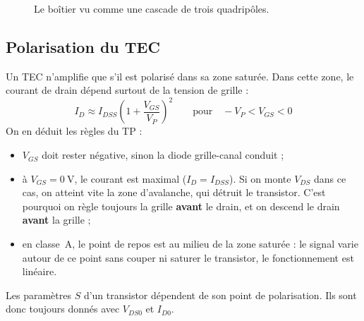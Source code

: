 \documentclass[12pt,a4paper]{article}
\begin{document}
\begin{figure}[H]
\centering
{}
\caption{Le boîtier vu comme une cascade de trois quadripôles.}
\label{fig:cascade}
\end{figure}

\subsection{Polarisation du TEC}

Un TEC n’amplifie que s’il est polarisé dans sa zone saturée. Dans cette zone, le courant de
drain dépend surtout de la tension de grille :
\begin{equation}
  I_D \approx I_{DSS}\left(1 + \frac{V_{GS}}{V_P}\right)^{2}
  \qquad\text{pour}\quad -V_P < V_{GS} < 0
  \label{eq:id}
\end{equation}
On en déduit les règles du TP :
\begin{itemize}
  \item $V_{GS}$ doit rester négative, sinon la diode grille-canal conduit ;
  \item à $V_{GS} = \SI{0}{\volt}$, le courant est maximal ($I_D = I_{DSS}$). Si on monte
        $V_{DS}$ dans ce cas, on atteint vite la zone d’avalanche, qui détruit le transistor.
        C’est pourquoi on règle toujours la grille \textbf{avant} le drain, et on descend le drain
        \textbf{avant} la grille ;
  \item en classe~A, le point de repos est au milieu de la zone saturée : le signal varie
        autour de ce point sans couper ni saturer le transistor, le fonctionnement est linéaire.
\end{itemize}
Les paramètres $S$ d’un transistor dépendent de son point de polarisation. Ils sont donc
toujours donnés avec $V_{DS0}$ et $I_{D0}$.
\end{document}
